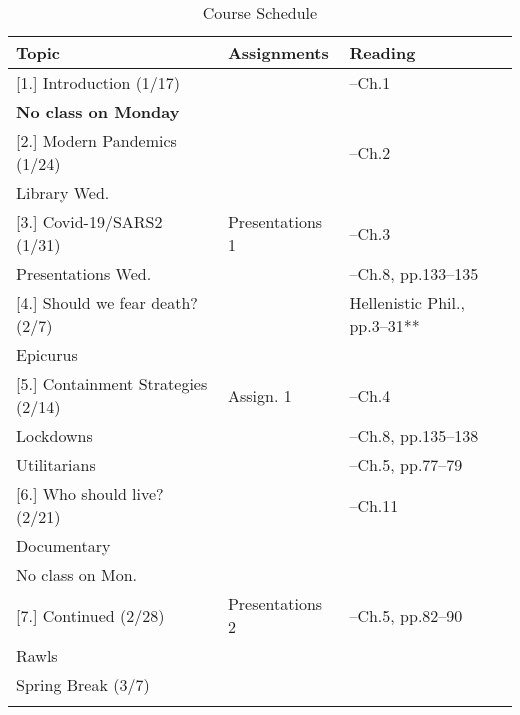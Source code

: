 \documentclass[article,oneside]{memoir}
\begin{document}
\begin{landscape}
\begin{center}
\begin{longtable}{p{6cm}p{6cm}p{4cm}}
 
  \caption{Course Schedule} \\
  \toprule
  \textbf{Topic}   & \textbf{Assignments} & \textbf{Reading} \\
  \midrule

  
[1.] Introduction (1/17) 						& 				&  --Ch.1 \\ 
\textbf{No class on Monday}					&				&   \\ [1.8\baselineskip] \hline


[2.] Modern Pandemics (1/24)	  				&  				& --Ch.2\\
Library Wed.					 			&				&  \\  [1.8\baselineskip] \hline



[3.] Covid-19/SARS2 (1/31)					& Presentations 1		& --Ch.3   \\ 
Presentations Wed.							& 					& --Ch.8, pp.133--135\\ [1.8\baselineskip]  \hline 

[4.] Should we fear death? (2/7)  				&     	 				&  Hellenistic Phil., pp.3–31** \\
Epicurus					  				& 					&  \\ [1.8\baselineskip]  \hline %


[5.] Containment Strategies (2/14)				& Assign. 1 			&  --Ch.4  \\
Lockdowns			    	    	 			&					&  --Ch.8, pp.135--138  \\ 
Utilitarians		    	    			 			&					&  --Ch.5, pp.77--79 \\  [1.8\baselineskip]  \hline 

[6.] Who should live?  (2/21)	   	 			&     					&  --Ch.11 \\
Documentary								&					&	 \\
No class on Mon.			     				&					&  	 \\ [1.8\baselineskip]  \hline 

[7.] Continued (2/28)							& Presentations 2		&  --Ch.5, pp.82--90 \\
Rawls							 		&	  				& \\  [1.8\baselineskip]  \hline


Spring Break (3/7) & &  \\ 
 & &  \\ [1.8\baselineskip]  \hline
 							


\end{longtable}
\end{center}
\end{landscape}
\end{document}
